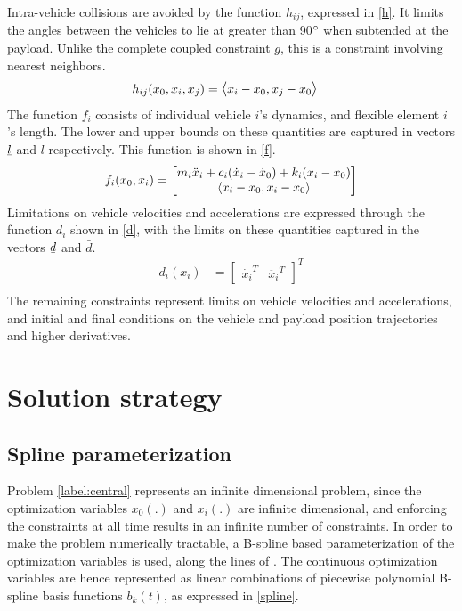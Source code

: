 \documentclass[letterpaper, 10 pt, conference]{ieeeconf}
\newcommand{\ubar}[1]{\text{\b{$#1$}}}
\begin{document}
\noindent
Intra-vehicle collisions are avoided by the function $h_{ij}$, expressed in \eqref{h}. It limits the angles between the vehicles to lie at greater than 90$\degree$ when subtended at the payload. Unlike the complete coupled constraint $g$, this is a constraint involving nearest neighbors.
 \begin{equation}\label{h}
\begin{aligned}
h_{ij}(x_0,x_i,x_j) &= \mathlarger{\langle} x_i - x_0,x_j - x_0 \mathlarger{\rangle}
\end{aligned}
\end{equation}
The function $f_i$ consists of individual vehicle $i$'s dynamics, and flexible element $i$'s length. The lower and upper bounds on these quantities are captured in vectors $\ubar{l}$ and $\bar{l}$ respectively. This function is shown in \eqref{f}.
 \begin{equation}\label{f}
 \begin{aligned}
 f_i(x_0,x_i) &=
 \begin{bmatrix}
   m_i\ddot{x}_i + c_i(\dot{x}_i-\dot{x}_0) + k_i(x_i-x_0) \\
  \mathlarger{\langle} x_i - x_0,x_i - x_0 \mathlarger{\rangle}
 \end{bmatrix} \\
 \end{aligned}
 \end{equation}
 Limitations on vehicle velocities and accelerations are expressed through the function $d_i$ shown in \eqref{d}, with the limits on these quantities captured in the vectors $\ubar{d}$ and $\bar{d}$.
 \begin{equation}\label{d}
 \begin{aligned}
 d_i(x_i) &=
 \begin{bmatrix}
  \dot{x_i}^T & \ddot{x_i}^T
 \end{bmatrix}^T \\
 \end{aligned}
 \end{equation}
 The remaining constraints represent limits on vehicle velocities and accelerations, and initial and final conditions on the vehicle and payload position trajectories and higher derivatives.
\section{Solution strategy}
\subsection{Spline parameterization}
Problem \eqref{label:central} represents an infinite dimensional problem, since the optimization variables $x_0(.)$ and $x_i(.)$ are infinite dimensional, and enforcing the constraints at all time results in an infinite number of constraints. In order to make the problem numerically tractable, a B-spline based parameterization of the optimization variables is used, along the lines of \cite{c15}. The continuous optimization variables are hence represented as linear combinations of piecewise polynomial B-spline basis functions $b_k(t)$, as expressed in \eqref{spline}.
\end{document}
